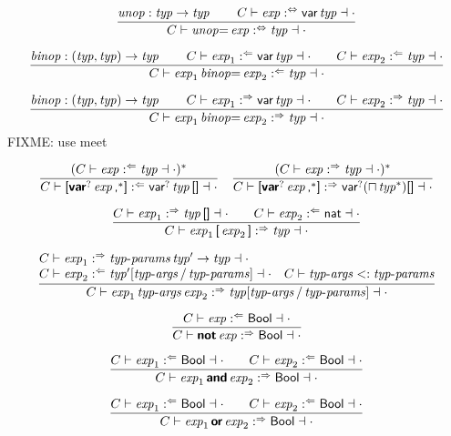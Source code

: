$$
\frac{
  \x{unop} : \x{typ} \Kto \x{typ}
  \qquad
  C \vdash \x{exp} \analsynth \K{var} \x{typ} \dashv \cdot
}{
  C \vdash \x{unop}{\!\K=} \x{exp} \analsynth \x{typ} \dashv \cdot
}
$$

$$
\frac{
  \x{binop} : (\x{typ}, \x{typ}) \Kto \x{typ}
  \qquad
  C \vdash \x{exp}_1 \anal \K{var} \x{typ} \dashv \cdot
  \qquad
  C \vdash \x{exp}_2 \anal \x{typ} \dashv \cdot
}{
  C \vdash \x{exp}_1 \x{binop}{\!\K=} \x{exp}_2 \anal \x{typ} \dashv \cdot
}
$$

$$
\frac{
  \x{binop} : (\x{typ}, \x{typ}) \Kto \x{typ}
  \qquad
  C \vdash \x{exp}_1 \synth \K{var} \x{typ} \dashv \cdot
  \qquad
  C \vdash \x{exp}_2 \synth \x{typ} \dashv \cdot
}{
  C \vdash \x{exp}_1 \x{binop}{\!\K=} \x{exp}_2 \synth \x{typ} \dashv \cdot
}
$$
FIXME: use meet

$$
\frac{
  (C \vdash \x{exp} \anal \x{typ} \dashv \cdot)^\ast
}{
  C \vdash \K[ \KK{var}^? \x{exp}\K,^\ast \K] \anal \K{var}^? \x{typ} \K{[]} \dashv \cdot
}
\quad
\frac{
  (C \vdash \x{exp} \synth \x{typ} \dashv \cdot)^\ast
}{
  C \vdash \K[ \KK{var}^? \x{exp}\K,^\ast \K] \synth \K{var}^? (\sqcap\x{typ}^\ast) \K{[]} \dashv \cdot
}
$$

$$
\frac{
  C \vdash \x{exp}_1 \synth \x{typ}\K{[]} \dashv \cdot
  \qquad
  C \vdash \x{exp}_2 \anal \K{nat} \dashv \cdot
}{
  C \vdash \x{exp}_1 \K[ \x{exp}_2 \K] \synth \x{typ} \dashv \cdot
}
$$

$$
\frac{
  \begin{array}{@{}ll@{}}
  C \vdash \x{exp}_1 \synth \x{typ-params} \x{typ}' \Kto \x{typ} \dashv \cdot
  \\
  C \vdash \x{exp}_2 \anal \x{typ}'[\x{typ-args} / \x{typ-params}] \dashv \cdot
  &
  C \vdash \x{typ-args} \Ksub \x{typ-params}
  \end{array}
}{
  C \vdash \x{exp}_1 \x{typ-args} \x{exp}_2 \synth \x{typ}[\x{typ-args} / \x{typ-params}] \dashv \cdot
}
$$

$$
\frac{
  C \vdash \x{exp} \anal \K{Bool} \dashv \cdot
}{
  C \vdash \KK{not} \x{exp} \synth \K{Bool} \dashv \cdot
}
$$

$$
\frac{
  C \vdash \x{exp}_1 \anal \K{Bool} \dashv \cdot
  \qquad
  C \vdash \x{exp}_2 \anal \K{Bool} \dashv \cdot
}{
  C \vdash \x{exp}_1 \KK{and} \x{exp}_2 \synth \K{Bool} \dashv \cdot
}
$$

$$
\frac{
  C \vdash \x{exp}_1 \anal \K{Bool} \dashv \cdot
  \qquad
  C \vdash \x{exp}_2 \anal \K{Bool} \dashv \cdot
}{
  C \vdash \x{exp}_1 \KK{or} \x{exp}_2 \synth \K{Bool} \dashv \cdot
}
$$

